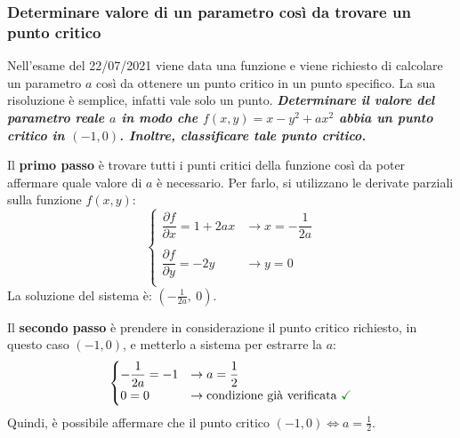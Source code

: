 \documentclass[a4paper]{article}
\begin{document}
	\subsubsection{Determinare valore di un parametro così da trovare un punto critico}\label{par: determinare valore di un parametro così da trovare un punto critico}

	Nell'esame del 22/07/2021 viene data una funzione e viene richiesto di calcolare un parametro $a$ così da ottenere un punto critico in un punto specifico. La sua risoluzione è semplice, infatti vale solo un punto.\newline
	\textcolor{Green4}{\textbf{\emph{Determinare il valore del parametro reale $a$ in modo che $f\left(x,y\right) = x - y^{2} + ax^{2}$ abbia un punto critico in $\left(-1, 0\right)$. Inoltre, classificare tale punto critico.}}}\newline

	\noindent
	Il \textbf{primo passo} è trovare tutti i punti critici della funzione così da poter affermare quale valore di $a$ è necessario. Per farlo, si utilizzano le derivate parziali sulla funzione $f\left(x,y\right)$:
	\begin{equation*}
		\begin{cases}
			\dfrac{\partial f}{\partial x} = 1 + 2ax	& \rightarrow x = -\dfrac{1}{2a} \\
			\\
			\dfrac{\partial f}{\partial y} = -2y		& \rightarrow y = 0 \\
		\end{cases}
	\end{equation*}
	La soluzione del sistema è: $\left(-\frac{1}{2a}, \: 0\right)$.\newline

	\noindent
	Il \textbf{secondo passo} è prendere in considerazione il punto critico richiesto, in questo caso $\left(-1, 0\right)$, e metterlo a sistema per estrarre la $a$:
	\begin{equation*}
		\begin{cases}
			-\dfrac{1}{2a} = -1 & \rightarrow a = \dfrac{1}{2} \\
			0 = 0 & \rightarrow \text{condizione già verificata } \textcolor{Green4}{\mathbf{\checkmark}}
		\end{cases}
	\end{equation*}
	Quindi, è possibile affermare che il punto critico $\left(-1,0\right) \iff a = \frac{1}{2}$.\newline
\end{document}
